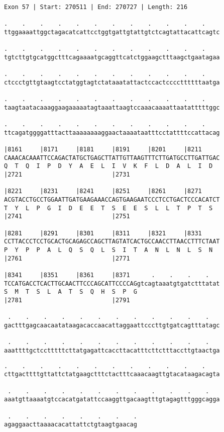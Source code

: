 \documentclass{article}
\begin{document}
\begin{Verbatim}[fontfamily=courier]
Exon 57 | Start: 270511 | End: 270727 | Length: 216

.    .    .    .    .    .    .    .    .    .    .    .    
ttggaaaattggctagacatcattcctggtgattgtattgtctcagtattacattcagtc

.    .    .    .    .    .    .    .    .    .    .    .    
tgtcttgtgcatggctttcagaaaatgcaggttcatctggaagctttaagctgaatagaa

.    .    .    .    .    .    .    .    .    .    .    .    
ctccctgttgtaagtcctatggtagtctataaatattactccactccccttttttaatga

.    .    .    .    .    .    .    .    .    .    .    .    
taagtaatacaaaggaagaaaaatagtaaattaagtccaaacaaaattaatatttttggc

.    .    .    .    .    .    .    .    .    .    .    .    
ttcagatggggatttacttaaaaaaaaggaactaaaataatttcctattttccattacag

|8161     |8171     |8181     |8191     |8201     |8211     
CAAACACAAATTCCAGACTATGCTGAGCTTATTGTTAAGTTTCTTGATGCCTTGATTGAC
Q  T  Q  I  P  D  Y  A  E  L  I  V  K  F  L  D  A  L  I  D  
|2721                         |2731                         

|8221     |8231     |8241     |8251     |8261     |8271     
ACGTACCTGCCTGGAATTGATGAAGAAACCAGTGAAGAATCCCTCCTGACTCCCACATCT
T  Y  L  P  G  I  D  E  E  T  S  E  E  S  L  L  T  P  T  S  
|2741                         |2751                         

|8281     |8291     |8301     |8311     |8321     |8331     
CCTTACCCTCCTGCACTGCAGAGCCAGCTTAGTATCACTGCCAACCTTAACCTTTCTAAT
P  Y  P  P  A  L  Q  S  Q  L  S  I  T  A  N  L  N  L  S  N  
|2761                         |2771                         

|8341     |8351     |8361     |8371      .    .    .    .   
TCCATGACCTCACTTGCAACTTCCCAGCATTCCCCAGgtcagtaaatgtgatctttatat
S  M  T  S  L  A  T  S  Q  H  S  P  G                       
|2781                         |2791                         

 .    .    .    .    .    .    .    .    .    .    .    .   
gactttgagcaacaatataagacaccaacattaggaattcccttgtgatcagtttatagc

 .    .    .    .    .    .    .    .    .    .    .    .   
aaattttgctcctttttcttatgagattcaccttacatttcttctttaccttgtaactga

\end{Verbatim}
\newpage
\begin{Verbatim}[fontfamily=courier]
 .    .    .    .    .    .    .    .    .    .    .    .   
cttgacttttgttattctatgaagctttctactttcaaacaagttgtacataagacagta

 .    .    .    .    .    .    .    .    .    .    .    .   
aaatgttaaaatgtccacatgatattccaaggttgacaagtttgtagagtttgggcagga

 .    .    .    .    .    .    .    .
agaggaacttaaaacacattattctgtaagtgaacag
\end{Verbatim}
\end{document}
